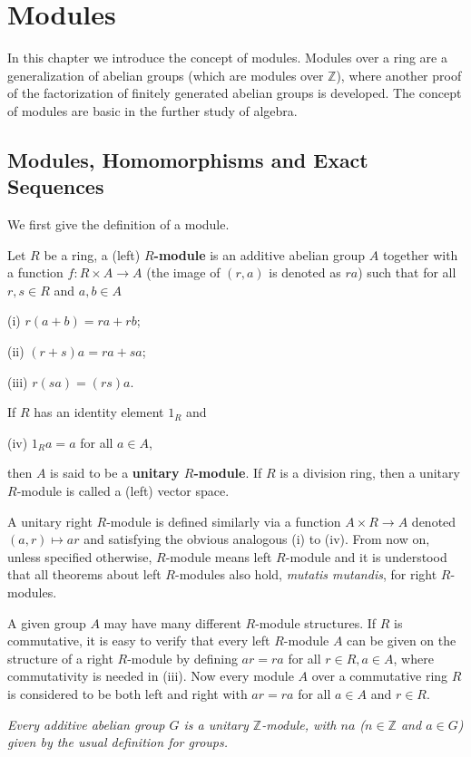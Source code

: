 \section{Modules}
In this chapter we introduce the concept of modules. Modules over a ring are a generalization of abelian groups (which are modules over $\mathbb{Z}$), where another proof of the factorization of finitely generated abelian groups is developed. The concept of modules are basic in the further study of algebra.
\subsection{Modules, Homomorphisms and Exact Sequences}
We first give the definition of a module.
\begin{definition}
Let $R$ be a ring, a (left) \textbf{$R$-module} is an additive abelian group $A$ together with a function $f:R\times A\to A$ (the image of $(r,a)$ is denoted as $ra$) such that for all $r,s\in R$ and $a,b\in A$ \par
(i) $r(a+b)=ra+rb$;\par
(ii) $(r+s)a=ra+sa$;\par
(iii) $r(sa)=(rs)a$.\par
If $R$ has an identity element $1_R$ and \par
(iv) $1_Ra=a$ for all $a\in A$,\par
then $A$ is said to be a \textbf{unitary $R$-module}. If $R$ is a division ring, then a unitary $R$-module is called a (left) vector space.
\end{definition}
A unitary right $R$-module is defined similarly via a function $A\times R\to A$ denoted $(a,r)\mapsto ar$ and satisfying the obvious analogous (i) to (iv). From now on, unless specified otherwise, $R$-module means left $R$-module and it is understood that all theorems about left $R$-modules also hold, \textit{mutatis mutandis}, for right $R$-modules.\par
A given group $A$ may have many different $R$-module structures. If $R$ is commutative, it is easy to verify that every left $R$-module $A$ can be given on the structure of a right $R$-module by defining $ar=ra$ for all $r\in R,a\in A$, where commutativity is needed in (iii). Now every module $A$ over a commutative ring $R$ is considered to be both left and right with $ar=ra$ for all $a\in A$ and $r\in R$.\par
\begin{example}\em
Every additive abelian group $G$ is a unitary $\mathbb{Z}$-module, with $na$ ($n\in\mathbb{Z}$ and $a\in G$) given by the usual definition for groups.
\end{example}
